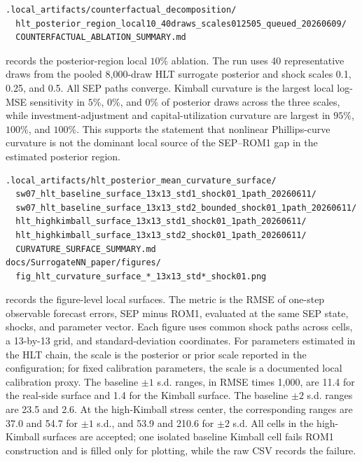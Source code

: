 \documentclass[12pt]{article}
\begin{document}
\begin{description}[leftmargin=2em,style=nextline,itemsep=0.45em]
\item[HLT posterior-region local ablation.]
\begin{verbatim}
.local_artifacts/counterfactual_decomposition/
  hlt_posterior_region_local10_40draws_scales012505_queued_20260609/
  COUNTERFACTUAL_ABLATION_SUMMARY.md
\end{verbatim}
records the posterior-region local \(10\%\) ablation. The run uses 40
representative draws from the pooled 8,000-draw HLT surrogate posterior and
shock scales 0.1, 0.25, and 0.5. All SEP paths converge. Kimball curvature is
the largest local log-MSE sensitivity in \(5\%\), \(0\%\), and \(0\%\) of
posterior draws across the three scales, while investment-adjustment and
capital-utilization curvature are largest in \(95\%\), \(100\%\), and
\(100\%\). This supports the statement that nonlinear Phillips-curve
curvature is not the dominant local source of the SEP--ROM1 gap in the
estimated posterior region.

\item[HLT curvature-surface figures.]
\begin{verbatim}
.local_artifacts/hlt_posterior_mean_curvature_surface/
  sw07_hlt_baseline_surface_13x13_std1_shock01_1path_20260611/
  sw07_hlt_baseline_surface_13x13_std2_bounded_shock01_1path_20260611/
  hlt_highkimball_surface_13x13_std1_shock01_1path_20260611/
  hlt_highkimball_surface_13x13_std2_shock01_1path_20260611/
  CURVATURE_SURFACE_SUMMARY.md
docs/SurrogateNN_paper/figures/
  fig_hlt_curvature_surface_*_13x13_std*_shock01.png
\end{verbatim}
records the figure-level local surfaces. The metric is the RMSE of one-step
observable forecast errors, SEP minus ROM1, evaluated at the same SEP state,
shocks, and parameter vector. Each figure uses common shock paths across cells,
a 13-by-13 grid, and standard-deviation coordinates. For parameters estimated
in the HLT chain, the scale is the posterior or prior scale reported in the
configuration; for fixed calibration parameters, the scale is a documented
local calibration proxy. The baseline \(\pm 1\) s.d. ranges, in RMSE times
1,000, are 11.4 for the real-side surface and 1.4 for the Kimball surface. The
baseline \(\pm 2\) s.d. ranges are 23.5 and 2.6. At the high-Kimball stress
center, the corresponding ranges are 37.0 and 54.7 for \(\pm 1\) s.d., and
53.9 and 210.6 for \(\pm 2\) s.d. All cells in the high-Kimball surfaces
are accepted; one isolated baseline Kimball cell fails ROM1 construction and
is filled only for plotting, while the raw CSV records the failure.


\end{description}
\end{document}
